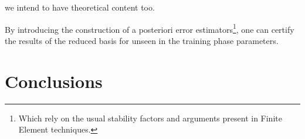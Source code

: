 \documentclass[a4paper, technote, compsoc]{IEEEtran}
\begin{document}
we intend to have theoretical content too.

By introducing the construction of a posteriori error estimators\footnote{Which rely on the usual stability factors and arguments present in Finite Element techniques.}, one can certify the results of the reduced basis for unseen in the training phase parameters.







\newpage
\section{Conclusions}
\label{sec:conclusions}

\printbibliography

\end{document}
